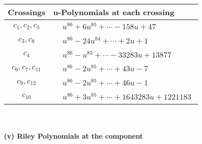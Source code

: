 \documentclass[1p]{elsarticle_modified}
\theoremstyle{definition}
\begin{document}
\begin{tabular}{m{50pt}|m{274pt}}
Crossings & \hspace{64pt}u-Polynomials at each crossing \\
\hline $$\begin{aligned}c_{1},c_{2},c_{5}\end{aligned}$$&$\begin{aligned}
&u^{86}+6 u^{85}+\cdots-158 u+47
\end{aligned}$\\
\hline $$\begin{aligned}c_{3},c_{8}\end{aligned}$$&$\begin{aligned}
&u^{86}-24 u^{84}+\cdots+2 u+1
\end{aligned}$\\
\hline $$\begin{aligned}c_{4}\end{aligned}$$&$\begin{aligned}
&u^{86}- u^{85}+\cdots-33283 u+13877
\end{aligned}$\\
\hline $$\begin{aligned}c_{6},c_{7},c_{11}\end{aligned}$$&$\begin{aligned}
&u^{86}-2 u^{85}+\cdots+43 u-7
\end{aligned}$\\
\hline $$\begin{aligned}c_{9},c_{12}\end{aligned}$$&$\begin{aligned}
&u^{86}-2 u^{85}+\cdots+46 u-1
\end{aligned}$\\
\hline $$\begin{aligned}c_{10}\end{aligned}$$&$\begin{aligned}
&u^{86}+3 u^{85}+\cdots+1643283 u+1221183
\end{aligned}$\\
\hline
\end{tabular}\\~\\
\newpage\renewcommand{\arraystretch}{1}
\flushleft \textbf{(v) Riley Polynomials at the component}\newline \\
\end{document}
